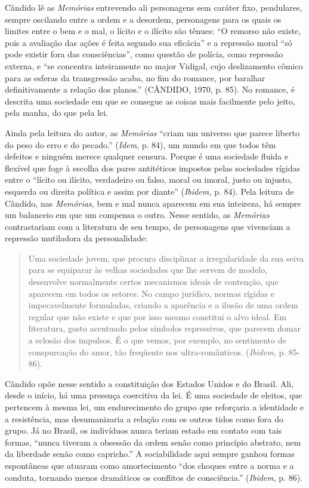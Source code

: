 Cândido lê as \emph{Memórias} entrevendo ali personagens sem caráter
fixo, pendulares, sempre oscilando entre a ordem e a desordem,
personagens para os quais os limites entre o bem e o mal, o lícito e o
ilícito são tênues: ``O remorso não existe, pois a avaliação das ações é
feita segundo sua eficácia'' e a repressão moral ``só pode existir fora
das consciências'', como questão de polícia, como repressão externa, e
``se concentra inteiramente no major Vidigal, cujo deslizamento cômico
para as esferas da transgressão acaba, no fim do romance, por baralhar
definitivamente a relação dos planos.'' (CÂNDIDO, 1970, p. 85). No
romance, é descrita uma sociedade em que se consegue as coisas mais
facilmente pelo jeito, pela manha, do que pela lei.

Ainda pela leitura do autor, as \emph{Memórias} ``criam um universo que
parece liberto do peso do erro e do pecado.'' (\emph{Idem}, p. 84), um
mundo em que todos têm defeitos e ninguém merece qualquer censura.
Porque é uma sociedade fluida e flexível que foge à escolha dos pares
antitéticos impostos pelas sociedades rígidas entre o ``lícito ou
ilícito, verdadeiro ou falso, moral ou imoral, justo ou injusto,
esquerda ou direita política e assim por diante'' (\emph{Ibidem,} p.
84). Pela leitura de Cândido, nas \emph{Memórias,} bem e mal nunca
aparecem em sua inteireza, há sempre um balanceio em que um compensa o
outro. Nesse sentido, as \emph{Memórias} contrastariam com a literatura
de seu tempo, de personagens que vivenciam a repressão mutiladora da
personalidade:

\begin{quote}
Uma sociedade jovem, que procura disciplinar a irregularidade da sua
seiva para se equiparar às velhas sociedades que lhe servem de modelo,
desenvolve normalmente certos mecanismos ideais de contenção, que
aparecem em todos os setores. No campo jurídico, normas rígidas e
impecavelmente formuladas, criando a aparência e a ilusão de uma ordem
regular que não existe e que por isso mesmo constitui o alvo ideal. Em
literatura, gosto acentuado pelos símbolos repressivos, que parecem
domar a eclosão dos impulsos. É o que vemos, por exemplo, no sentimento
de conspurcação do amor, tão freqüente nos ultra-românticos.
(\emph{Ibidem}, p. 85-86).
\end{quote}

Cândido opõe nesse sentido a constituição dos Estados Unidos e do
Brasil. Ali, desde o início, há uma presença coercitiva da lei. É uma
sociedade de eleitos, que pertencem à mesma lei, um endurecimento do
grupo que reforçaria a identidade e a resistência, mas desumanizaria a
relação com os outros tidos como fora do grupo. Já no Brasil, os
indivíduos nunca teriam estado em contato com tais formas, ``nunca
tiveram a obsessão da ordem senão como princípio abstrato, nem da
liberdade senão como capricho.'' A sociabilidade aqui sempre ganhou
formas espontâneas que atuaram como amortecimento ``dos choques entre a
norma e a conduta, tornando menos dramáticos os conflitos de
consciência.'' (\emph{Ibidem}, p. 86).

